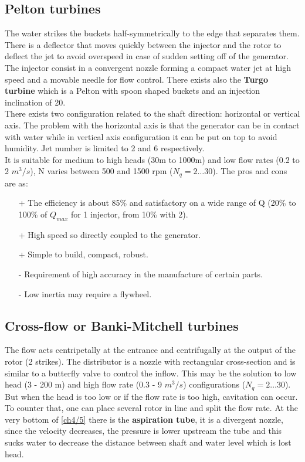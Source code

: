 \subsection{Pelton turbines}
The water strikes the buckets half-symmetrically to the edge that separates them. There is a deflector that moves quickly between the injector and the rotor to deflect the jet to avoid overspeed in case of sudden setting off of the generator. The injector consist in a convergent nozzle forming a compact water jet at high speed and a movable needle for flow control. There exists also the \textbf{Turgo turbine} which is a Pelton with spoon shaped buckets and an injection inclination of 20\degres . \\

There exists two configuration related to the shaft direction: horizontal or vertical axis. The problem with the horizontal axis is that the generator can be in contact with water while in vertical axis configuration it can be put on top to avoid humidity. Jet number is limited to 2 and 6 respectively.\\

It is suitable for medium to high heads (30m to 1000m) and low flow rates (0.2 to 2 $m^3/s$), N varies between 500 and 1500 rpm ($N_q = 2\dots 30$). The pros and cons are as: 

\begin{itemize}
\item[+] The efficiency is about 85\% and satisfactory on a wide range of Q (20\% to 100\% of $Q_{max}$ for 1 injector, from 10\% with 2). 
\item[+] High speed so directly coupled to the generator.
\item[+] Simple to build, compact, robust. 
\item[-] Requirement of high accuracy in the manufacture of certain parts. 
\item[-] Low inertia may require a flywheel. 
\end{itemize}

\subsection{Cross-flow or Banki-Mitchell turbines}

The flow acts centripetally at the entrance and centrifugally at the output of the rotor (2 strikes). The distributor is a nozzle with rectangular cross-section and is similar to a butterfly valve to control the inflow. This may be the solution to low head (3 - 200 m) and high flow rate (0.3 - 9 $m^3/s$) configurations ($N_q = 2\dots 30$). But when the head is too low or if the flow rate is too high, cavitation can occur. To counter that, one can place several rotor in line and split the flow rate. At the very bottom of \autoref{ch4/5} there is the \textbf{aspiration tube}, it is a divergent nozzle, since the velocity decreases, the pressure is lower upstream the tube and this sucks water to decrease the distance between shaft and water level which is lost head. \\

